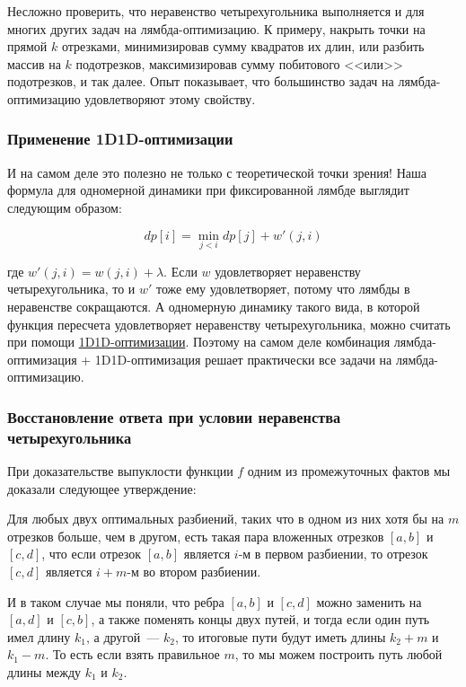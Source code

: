 Несложно проверить, что неравенство четырехугольника выполняется и для многих других задач на лямбда-оптимизацию. К примеру, накрыть точки на прямой $k$ отрезками, минимизировав сумму квадратов их длин, или разбить массив на $k$ подотрезков, максимизировав сумму побитового <<или>> подотрезков, и так далее. Опыт показывает, что большинство задач на лямбда-оптимизацию удовлетворяют этому свойству.

\subsubsection{Применение 1D1D-оптимизации}

И на самом деле это полезно не только с теоретической точки зрения! Наша формула для одномерной динамики при фиксированной лямбде выглядит следующим образом:

$$dp[i] = \min \limits_{j < i} dp[j] + w'(j, i)$$

где $w'(j, i) = w(j, i) + \lambda$. Если $w$ удовлетворяет неравенству четырехугольника, то и $w'$ тоже ему удовлетворяет, потому что лямбды в неравенстве сокращаются. А одномерную динамику такого вида, в которой функция пересчета удовлетворяет неравенству четырехугольника, можно считать при помощи \href{https://codeforces.com/blog/entry/93772}{1D1D-оптимизации}. Поэтому на самом деле комбинация лямбда-оптимизация + 1D1D-оптимизация решает практически все задачи на лямбда-оптимизацию.

\subsubsection{Восстановление ответа при условии неравенства четырехугольника}

При доказательстве выпуклости функции $f$ одним из промежуточных фактов мы доказали следующее утверждение:

\begin{lemma}
    Для любых двух оптимальных разбиений, таких что в одном из них хотя бы на $m$ отрезков больше, чем в другом, есть такая пара вложенных отрезков $[a, b]$ и $[c, d]$, что если отрезок $[a, b]$ является $i$-м в первом разбиении, то отрезок $[c, d]$ является $i+m$-м во втором разбиении.
\end{lemma}

И в таком случае мы поняли, что ребра $[a, b]$ и $[c, d]$ можно заменить на $[a, d]$ и $[c, b]$, а также поменять концы двух путей, и тогда если один путь имел длину $k_1$, а другой~--- $k_2$, то итоговые пути будут иметь длины $k_2 + m$ и $k_1 - m$. То есть если взять правильное $m$, то мы можем построить путь любой длины между $k_1$ и $k_2$.

